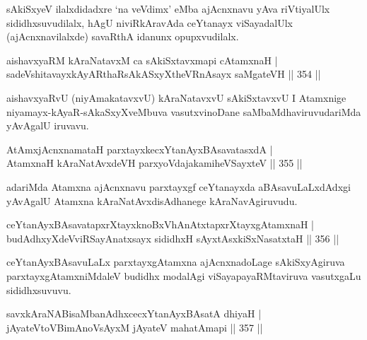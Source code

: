 \begin{artha}
sAkiSxyeV ilalxdidadxre `na veVdimx' eMba ajAcnxnavu yAva riVtiyalUlx sididhxsuvudilalx, hAgU niviRkAravAda ceYtanayx viSayadalUlx (ajAcnxnavilalxde) savaRthA idanunx opupxvudilalx.
\end{artha}

\begin{shl}
aishavxyaRM kAraNatavxM ca sAkiSxtavxmapi cA\s \s tamxnaH | \\
sadeVshitavayxkAyARthaRsAkASxyXtheVRnAsayx saMgateVH \hfill||  354 ||  
\end{shl}

\begin{artha}
aishavxyaRvU (niyAmakatavxvU) kAraNatavxvU sAkiSxtavxvU I Atamxnige niyamayx-kAyaR-sAkaSxyXveMbuva vasutxvinoDane saMbaMdhaviruvudariMda yAvAgalU iruvavu.
\end{artha}


\begin{shl}
AtAmxjAcnxnamataH parxtayxkecxYtanAyxBAsavatasxdA | \\
AtamxnaH kAraNatAvxdeVH parxyoVdajakamiheVSayxteV \hfill||  355 ||  
\end{shl}

\begin{artha}
adariMda Atamxna ajAcnxnavu parxtayxgf ceYtanayxda aBAsavuLaLxdAdxgi yAvAgalU Atamxna kAraNatAvxdisAdhanege kAraNavAgiruvudu.
\end{artha}

\begin{shl}
ceYtanAyxBAsavatapxrXtayxknoBxVhAnAtxtapxrXtayxgAtamxnaH | \\
budAdhxyXdeVviRSayAnatxsayx sididhxH sAyxtAsxkiSxNasatxtaH \hfill||  356 ||  
\end{shl}

\begin{artha}
ceYtanAyxBAsavuLaLx parxtayxgAtamxna ajAcnxnadoLage sAkiSxyAgiruva parxtayxgAtamxniMdaleV budidhx modalAgi viSayapayaRMtaviruva vasutxgaLu sididhxsuvuvu.
\end{artha}


\begin{shl}
savxkAraNABisaMbanAdhxcecxYtanAyxBAsatA dhiyaH | \\
jAyateV\s toV\s BimAnoV\s sAyxM jAyateV mahatAmapi \hfill||  357 ||  
\end{shl}

